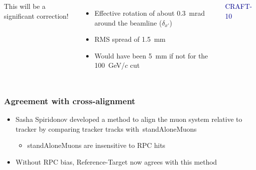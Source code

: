 \documentclass[compress]{beamer}
\begin{document}
\begin{frame}
\begin{columns}
This will be a significant correction!

\begin{itemize}
\item Effective rotation of about 0.3~mrad around the beamline ($\delta_{x'}$)
\item RMS spread of 1.5~mm
\item Would have been 5~mm if not for the 100~GeV/$c$ cut
\end{itemize}

\hfill \textcolor{darkblue}{\scriptsize CRAFT-10}
\end{columns}
\end{frame}

\begin{frame}
\frametitle{Agreement with cross-alignment}

\begin{itemize}
\item Sasha Spiridonov developed a method to align the muon
  system relative to tracker by comparing tracker tracks \mbox{with standAloneMuons\hspace{-1 cm}}
\begin{itemize}
\item standAloneMuons are insensitive to RPC hits
\end{itemize}
\item Without RPC bias, Reference-Target now agrees with this method
\end{itemize}

\end{frame}
\end{document}
